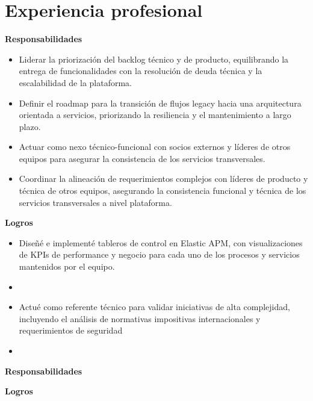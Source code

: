 \documentclass[10pt,a4paper]{article}
\begin{document}
	\section{Experiencia profesional}
	
	
	\noindent\textbf{Responsabilidades}
	\begin{itemize}
		\item Liderar la priorización del backlog técnico y de producto, equilibrando la entrega de funcionalidades con la resolución de deuda técnica y la escalabilidad de la plataforma.
		\item Definir el roadmap para la transición de flujos legacy hacia una arquitectura orientada a servicios, priorizando la resiliencia y el mantenimiento a largo plazo.
		\item Actuar como nexo técnico-funcional con socios externos y líderes de otros equipos para asegurar la consistencia de los servicios transversales.
		\item Coordinar la alineación de requerimientos complejos con líderes de producto y técnica de otros equipos, asegurando la consistencia funcional y técnica de los servicios transversales a nivel plataforma.
	\end{itemize}
	
	\noindent\textbf{Logros}
		\begin{itemize}
		\item Diseñé e implementé tableros de control en Elastic APM, con visualizaciones de KPIs de performance y negocio para cada uno de los procesos y servicios mantenidos por el equipo.
		\item %
		\item Actué como referente técnico para validar iniciativas de alta complejidad, incluyendo el análisis de normativas impositivas internacionales y requerimientos de seguridad 
		\item %
	\end{itemize}
	
	
	\noindent\textbf{Responsabilidades}
	
	\noindent\textbf{Logros}
	
	
\end{document}
